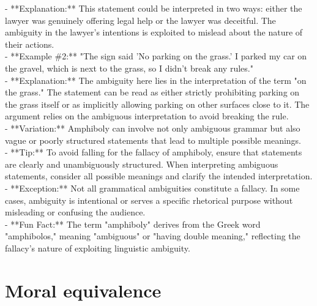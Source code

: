 \documentclass[a4paper,12pt,single,pdftex]{scrbook}
\begin{document}
    
      - **Explanation:** This statement could be interpreted in two ways: either the lawyer was genuinely offering legal help or the lawyer was deceitful. The ambiguity in the lawyer's intentions is exploited to mislead about the nature of their actions.
    \\

    
      - **Example \#2:** "The sign said 'No parking on the grass.' I parked my car on the gravel, which is next to the grass, so I didn't break any rules."
    \\

    
      - **Explanation:** The ambiguity here lies in the interpretation of the term "on the grass." The statement can be read as either strictly prohibiting parking on the grass itself or as implicitly allowing parking on other surfaces close to it. The argument relies on the ambiguous interpretation to avoid breaking the rule.
    \\

    
      - **Variation:** Amphiboly can involve not only ambiguous grammar but also vague or poorly structured statements that lead to multiple possible meanings.
    \\

    
      - **Tip:** To avoid falling for the fallacy of amphiboly, ensure that statements are clearly and unambiguously structured. When interpreting ambiguous statements, consider all possible meanings and clarify the intended interpretation.
    \\

    
      - **Exception:** Not all grammatical ambiguities constitute a fallacy. In some cases, ambiguity is intentional or serves a specific rhetorical purpose without misleading or confusing the audience.
    \\

    
      - **Fun Fact:** The term "amphiboly" derives from the Greek word "amphibolos," meaning "ambiguous" or "having double meaning," reflecting the fallacy's nature of exploiting linguistic ambiguity.
    \\

  \section{Moral equivalence}
\end{document}
